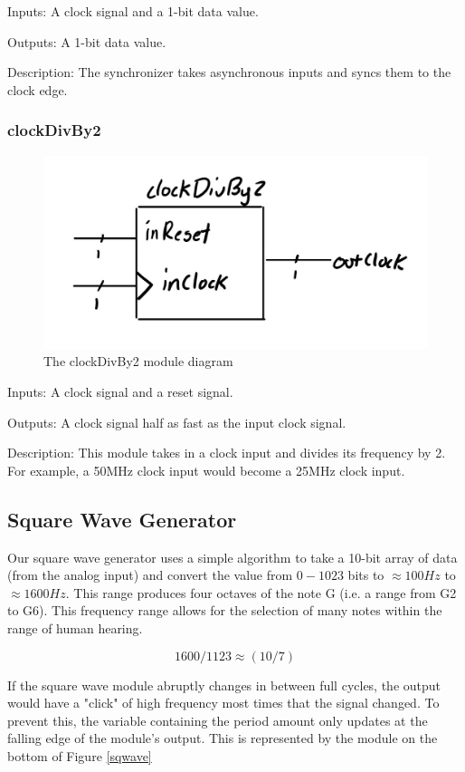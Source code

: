 \documentclass[a4paper]{article}
\begin{document}
Inputs: A clock signal and a 1-bit data value.

Outputs: A 1-bit data value.

Description: The synchronizer takes asynchronous inputs and syncs them to the clock edge.

\subsubsection{clockDivBy2}

\begin{figure}[H]
    \includegraphics[width=0.8 \linewidth]{images/clockDivBy2.JPG}
    \caption{The clockDivBy2 module diagram}
    \label{clockDivBy2Diagram}
\end{figure}

Inputs: A clock signal and a reset signal.

Outputs: A clock signal half as fast as the input clock signal.

Description: This module takes in a clock input and divides its frequency by 2. For example, a 50MHz clock input would become a 25MHz clock input.

\subsection{Square Wave Generator}
Our square wave generator uses a simple algorithm to take a 10-bit array of data (from the analog input) and convert the value from $0-1023 $ bits to $\approx 100Hz $ to$ \approx 1600 Hz$. This range produces four octaves of the note G (i.e. a range from G2 to G6). This frequency range allows for the selection of many notes within the range of human hearing. 


\begin{equation}
1600/1123 \approx (10/7)
\end{equation}

If the square wave module abruptly changes in between full cycles, the output would have a "click" of high frequency most times that the signal changed. To prevent this, the variable containing the period amount only updates at the falling edge of the module's output. This is represented by the module on the bottom of Figure \ref{sqwave}
\end{document}
